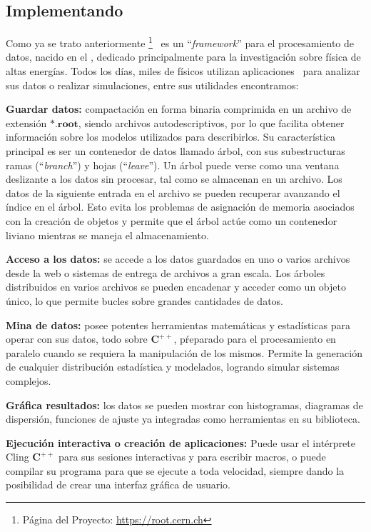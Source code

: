 \subsection{Implementando \ROOT}\label{C_root}
Como ya se trato anteriormente \ROOT \footnote{Página del Proyecto: \href{https://root.cern.ch}{https://root.cern.ch}}~ es un ``\textit{framework}'' para el procesamiento de datos, nacido en el \CERN, dedicado principalmente para la investigación sobre física de altas energías. Todos los días, miles de físicos utilizan aplicaciones \ROOT ~para analizar sus datos o realizar simulaciones, entre sus utilidades encontramos:
\begin{itemize_f}
\item \textbf{Guardar datos:} compactación en forma binaria comprimida en un archivo de extensión $\mathbf{*.root}$, siendo archivos autodescriptivos, por lo que facilita obtener información sobre los modelos utilizados para describirlos. Su característica principal es ser un contenedor de datos llamado árbol, con sus subestructuras ramas (``\textit{branch}'') y hojas (``\textit{leave}''). Un árbol puede verse como una ventana deslizante a los datos sin procesar, tal como se almacenan en un archivo. Los datos de la siguiente entrada en el archivo se pueden recuperar avanzando el índice en el árbol. Esto evita los problemas de asignación de memoria asociados con la creación de objetos y permite que el árbol actúe como un contenedor liviano mientras se maneja el almacenamiento.

\item \textbf{Acceso a los datos:} se accede a los datos guardados en uno o varios archivos \ROOT ~ desde la web o sistemas de entrega de archivos a gran escala. Los árboles \ROOT ~ distribuidos en varios archivos se pueden encadenar y acceder como un objeto único, lo que permite bucles sobre grandes cantidades de datos.

\item \textbf{Mina de datos:} posee potentes herramientas matemáticas y estadísticas para operar con sus datos, todo sobre $\mathbf{C^{++}}$, pŕeparado para el procesamiento en paralelo cuando se requiera la manipulación de los mismos. Permite la generación de cualquier distribución estadística y modelados, logrando simular sistemas complejos.

\item \textbf{Gráfica resultados:} los datos se pueden mostrar con histogramas, diagramas de dispersión, funciones de ajuste ya integradas como herramientas en su biblioteca.

\item \textbf{Ejecución interactiva o creación de aplicaciones:} Puede usar el intérprete Cling $\mathbf{C}^{++}$ para sus sesiones interactivas y para escribir macros, o puede compilar su programa para que se ejecute a toda velocidad, siempre dando la posibilidad de crear una interfaz gráfica de usuario.
\end{itemize_f}

